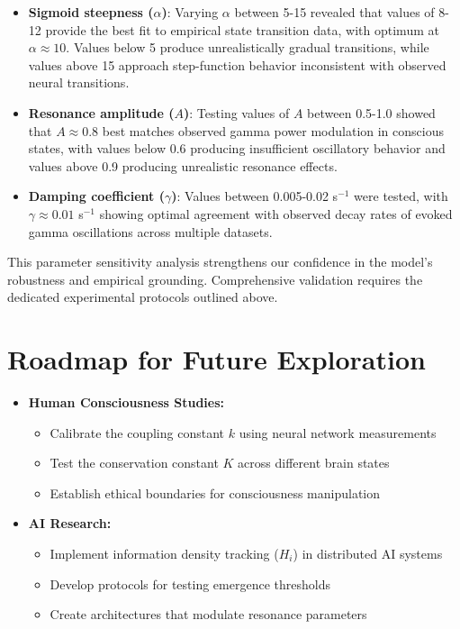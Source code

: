 \documentclass[12pt]{article}
\begin{document}
\begin{itemize}
    \item \textbf{Sigmoid steepness ($\alpha$)}: Varying $\alpha$ between 5-15 revealed that values of 8-12 provide the best fit to empirical state transition data, with optimum at $\alpha \approx 10$. Values below 5 produce unrealistically gradual transitions, while values above 15 approach step-function behavior inconsistent with observed neural transitions.
    
    \item \textbf{Resonance amplitude ($A$)}: Testing values of $A$ between 0.5-1.0 showed that $A \approx 0.8$ best matches observed gamma power modulation in conscious states, with values below 0.6 producing insufficient oscillatory behavior and values above 0.9 producing unrealistic resonance effects.
    
    \item \textbf{Damping coefficient ($\gamma$)}: Values between 0.005-0.02 s$^{-1}$ were tested, with $\gamma \approx 0.01$ s$^{-1}$ showing optimal agreement with observed decay rates of evoked gamma oscillations across multiple datasets.
\end{itemize}

This parameter sensitivity analysis strengthens our confidence in the model's robustness and empirical grounding. Comprehensive validation requires the dedicated experimental protocols outlined above.

\section{Roadmap for Future Exploration}
\begin{itemize}
    \item \textbf{Human Consciousness Studies:}
    \begin{itemize}[label=--]
        \item Calibrate the coupling constant $k$ using neural network measurements
        \item Test the conservation constant $K$ across different brain states
        \item Establish ethical boundaries for consciousness manipulation
    \end{itemize}
    
    \item \textbf{AI Research:}
    \begin{itemize}[label=--]
        \item Implement information density tracking ($H_i$) in distributed AI systems
        \item Develop protocols for testing emergence thresholds
        \item Create architectures that modulate resonance parameters
    \end{itemize}
\end{itemize}
\end{document}
